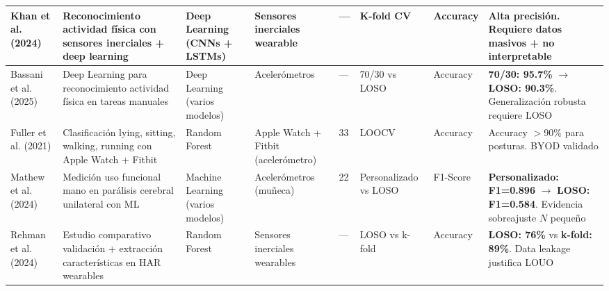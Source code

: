 \begin{table}[htbp]
\begin{tabular}{@{}p{1.8cm}p{2.2cm}p{1.5cm}p{1.3cm}p{0.8cm}p{1.2cm}p{1.8cm}p{1.5cm}@{}}
        \midrule
        
        
        Khan et al. (2024) \cite{Khan2024Wearable} & 
        Reconocimiento actividad física con sensores inerciales + deep learning & 
        Deep Learning (CNNs + LSTMs) & 
        Sensores inerciales wearable & 
        --- & 
        K-fold CV & 
        Accuracy & 
        Alta precisión. Requiere datos masivos + no interpretable \\
        
        \midrule
        
        Bassani et al. (2025) \cite{Bassani2025DLHAR} & 
        Deep Learning para reconocimiento actividad física en tareas manuales & 
        Deep Learning (varios modelos) & 
        Acelerómetros & 
        --- & 
        70/30 vs LOSO & 
        Accuracy & 
        \textbf{70/30: 95.7\%} $\rightarrow$ \textbf{LOSO: 90.3\%}. Generalización robusta requiere LOSO \\
        
        \midrule
        
        
        Fuller et al. (2021) \cite{Fuller2021Predicting} & 
        Clasificación lying, sitting, walking, running con Apple Watch + Fitbit & 
        Random Forest & 
        Apple Watch + Fitbit (acelerómetro) & 
        33 & 
        LOOCV & 
        Accuracy & 
        Accuracy $>$90\% para posturas. BYOD validado \\
        
        \midrule
        
        Mathew et al. (2024) \cite{Mathew2024LOSO} & 
        Medición uso funcional mano en parálisis cerebral unilateral con ML & 
        Machine Learning (varios modelos) & 
        Acelerómetros (muñeca) & 
        22 & 
        Personalizado vs LOSO & 
        F1-Score & 
        \textbf{Personalizado: F1=0.896} $\rightarrow$ \textbf{LOSO: F1=0.584}. Evidencia sobreajuste $N$ pequeño \\
        
        \midrule
        
        Rehman et al. (2024) \cite{Rehman2024LOSO} & 
        Estudio comparativo validación + extracción características en HAR wearables & 
        Random Forest & 
        Sensores inerciales wearables & 
        --- & 
        LOSO vs k-fold & 
        Accuracy & 
        \textbf{LOSO: 76\%} vs \textbf{k-fold: 89\%}. Data leakage justifica LOUO \\
        

\end{tabular}
\end{table}
